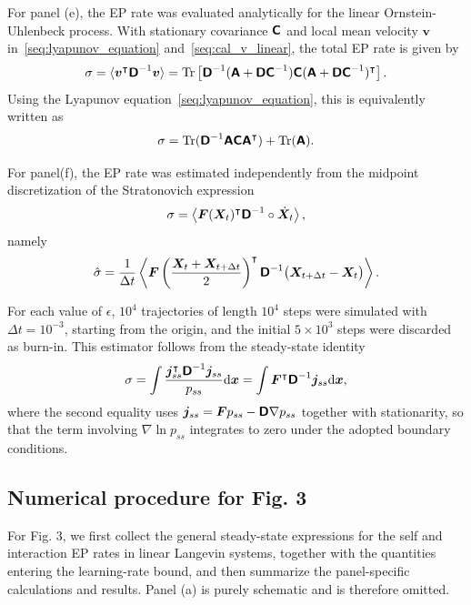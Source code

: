 For panel (e), the EP rate was evaluated analytically for the linear Ornstein-Uhlenbeck process. 
With stationary covariance $\boldsymbol{\mathsf{C}}$ and local mean velocity $\bm v$ in~\eqref{seq:lyapunov_equation} and~\eqref{seq:cal_v_linear}, the total EP rate is given by
\[
    \sigma=\langle\bm v^\intercal\boldsymbol{\mathsf{D}}^{-1}\bm v\rangle=
    \mathrm{Tr}\left[\boldsymbol{\mathsf{D}}^{-1}(\boldsymbol{\mathsf{A}}+\boldsymbol{\mathsf{D}}\boldsymbol{\mathsf{C}}^{-1})\boldsymbol{\mathsf{C}}(\boldsymbol{\mathsf{A}}+\boldsymbol{\mathsf{D}}\boldsymbol{\mathsf{C}}^{-1})^\intercal\right].
\]
Using the Lyapunov equation~\eqref{seq:lyapunov_equation}, this is equivalently written as
\begin{equation}
    \sigma=\mathrm{Tr}(\boldsymbol{\mathsf{D}}^{-1}\boldsymbol{\mathsf{A}}\boldsymbol{\mathsf{C}}\boldsymbol{\mathsf{A}}^\intercal)
    +\mathrm{Tr}(\boldsymbol{\mathsf{A}}).
    \label{seq:sigma_linear}
\end{equation}

For panel(f), the EP rate was estimated independently from the midpoint discretization of the Stratonovich expression
\[
    \sigma=\left\langle\bm F(\bm X_t)^\intercal\boldsymbol{\mathsf{D}}^{-1}\circ\dot{\bm X}_t\right\rangle,
\]
namely
\[
    \hat\sigma=\frac{1}{\Delta t}\left\langle
    \bm F\left(\frac{\bm X_t+\bm X_{t+\Delta t}}{2}\right)^\intercal
    \boldsymbol{\mathsf{D}}^{-1}\big(\bm X_{t+\Delta t}-\bm X_t\big)\right\rangle.
\]

For each value of $\epsilon$, $10^4$ trajectories of length $10^4$ steps were simulated with $\Delta t=10^{-3}$, starting from the origin, and the initial $5\times10^3$ steps were discarded as burn-in. This estimator follows from the steady-state identity
\[
    \sigma=\int\frac{\bm j_{ss}^\intercal\boldsymbol{\mathsf{D}}^{-1}\bm j_{ss}}{p_{ss}}\mathrm d\bm x
    =\int\bm F^\intercal\boldsymbol{\mathsf{D}}^{-1}\bm j_{ss}\mathrm d\bm x,
\]
where the second equality uses $\bm j_{ss}=\bm Fp_{ss}-\boldsymbol{\mathsf{D}}\nabla p_{ss}$ together with stationarity, so that the term involving $\nabla\ln p_{ss}$ integrates to zero under the adopted boundary conditions.


\subsection{Numerical procedure for Fig. 3}
\vspace*{-0.6\baselineskip}

For Fig. 3, we first collect the general steady-state expressions for the self and interaction EP rates in linear Langevin systems, together with the quantities entering the learning-rate bound, and then summarize the panel-specific calculations and results. Panel (a) is purely schematic and is therefore omitted.

